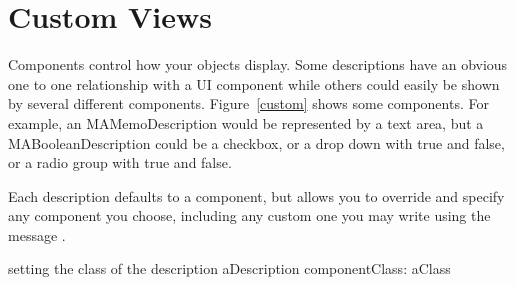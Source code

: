 \documentclass[a4paper,10pt,twoside]{book}
\begin{document}
% 




\section{Custom Views}
Components control how your objects display. Some  descriptions have an obvious one to one relationship with a UI component while others could easily be shown by several different components. Figure~\ref{custom} shows some components. For example, an MAMemoDescription would be represented by a text area, but a MABooleanDescription could be a checkbox, or a drop down with true and false, or a radio group with true and false. 

Each description defaults to a component, but allows you to override and specify any component you 
choose, including any custom one you may write using the message . 

\begin{code}{setting the class of the description}
aDescription componentClass: aClass
\end{code}
\end{document}
